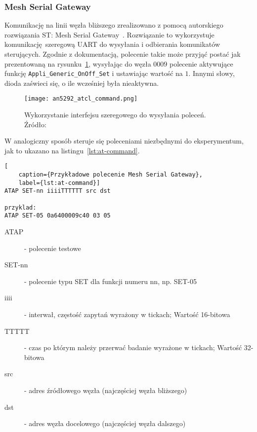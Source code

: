 \subsubsection{Mesh Serial Gateway}\label{mesh:serial-gateway}
Komunikację na linii węzła bliższego zrealizowano z pomocą autorskiego rozwiązania ST: Mesh Serial Gateway~\cite{st_an5292_2021}.
Rozwiązanie to wykorzystuje komunikację szeregową \gls{UART} do wysyłania i odbierania komunikatów sterujących.
Zgodnie z dokumentacją, polecenie takie może przyjąć postać jak prezentowaną na rysunku~\ref{an5292_atcl_command}, wysyłając do węzła $0009$
polecenie aktywujące funkcję \texttt{Appli\_Generic\_OnOff\_Set} i ustawiając wartość na $1$. Innymi słowy, dioda zaświeci
się, o ile wcześniej była nieaktywna.

\begin{figure}[!htb]
	\centering \texttt{[image: an5292\_atcl\_command.png]}
	\caption{Wykorzystanie interfejsu szeregowego do wysyłania poleceń. Źródło:~\cite{st_an5292_2021}}
	\label{an5292_atcl_command}
\end{figure}

W analogiczny sposób steruje się poleceniami niezbędnymi do eksperymentum, jak to ukazano na listingu~\ref{lst:at-command}.
\begin{lstlisting}[
    caption={Przykładowe polecenie Mesh Serial Gateway},
    label={lst:at-command}]
ATAP SET-nn iiiiTTTTTT src dst

przyklad:
ATAP SET-05 0a6400009c40 03 05
\end{lstlisting}

\begin{description}
\item [ATAP] - polecenie testowe
\item [SET-nn] - polecenie typu SET dla funkcji numeru nn, np. SET-05
\item [iiii] - interwał, częstość zapytań wyrażony w tickach; Wartość 16-bitowa
\item [TTTTT] - czas po którym należy przerwać badanie wyrażone w tickach; Wartość 32-bitowa
\item [src] - adres źródłowego węzła (najczęściej węzła bliższego)
\item [dst] - adres węzła docelowego (najczęściej węzła dalszego)
\end{description}


